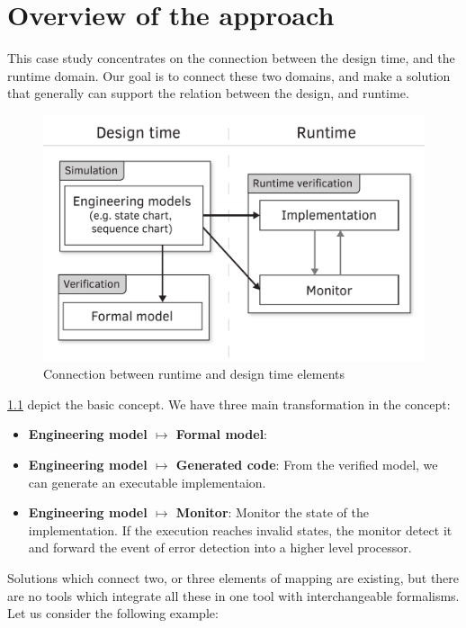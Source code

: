 \chapter{Overview of the approach}
\label{chap:overview}

This case study concentrates on the connection between the design time, and the runtime domain. Our goal is to connect these two domains, and make a solution that generally can support the relation between the design, and runtime.

\begin{figure}[h]
	\centering
	\includegraphics[width=0.75\linewidth]{include/figures/chapter_3/abstract_overview}
	\caption{Connection between runtime and design time elements}
	\label{fig:overview:abstract_overview}
\end{figure}

\cref{fig:overview:abstract_overview} depict the basic concept. We have three main transformation in the concept:
\begin{itemize}
	\item \textbf{Engineering model $\mapsto$ Formal model}: 
	\item \textbf{Engineering model $\mapsto$ Generated code}: From the verified model, we can generate an executable implementaion.
	\item \textbf{Engineering model $\mapsto$ Monitor}: Monitor the state of the implementation. If the execution reaches invalid states, the monitor detect it and forward the event of error detection into a higher level processor.
\end{itemize}
Solutions which connect two, or three elements of mapping are existing, but there are no tools which integrate all these in one tool with interchangeable formalisms. 
\\[1ex]

\noindent Let us consider the following example:

